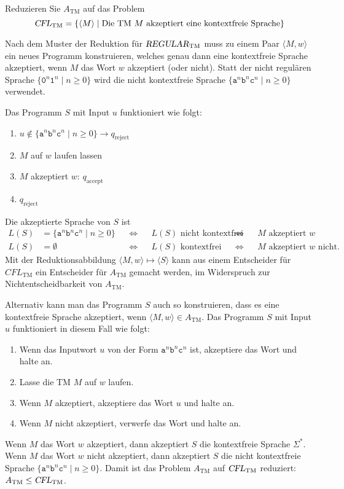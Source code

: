 Reduzieren Sie $A_{\text{TM}}$ auf das Problem
\[
\textsl{CFL}_{\text{TM}}
=
\{
\langle M\rangle
\mid
\text{Die TM $M$ akzeptiert eine kontextfreie Sprache}
\}
\]


\begin{loesung}
Nach dem Muster der Reduktion für $\textsl{REGULAR}_{\text{TM}}$
muss zu einem Paar $\langle M,w\rangle$ ein neues Programm konstruieren,
welches genau dann eine kontextfreie Sprache akzeptiert, wenn 
$M$ das Wort $w$ akzeptiert (oder nicht).
Statt der nicht regulären Sprache $\{\texttt{0}^n\texttt{1}^n\mid n\ge 0\}$
wird die nicht kontextfreie Sprache
$\{\texttt{a}^n\texttt{b}^n\texttt{c}^n\mid n\ge 0\}$ verwendet.

Das Programm $S$ mit Input $u$ funktioniert wie folgt:
\begin{enumerate}
\item
$u\not\in \{\texttt{a}^n\texttt{b}^n\texttt{c}^n\mid n\ge 0\}
\rightarrow
q_{\text{reject}}$
\item
$M$ auf $w$ laufen lassen
\item
$M$ akzeptiert $w$: $q_{\text{accept}}$
\item
$q_{\text{reject}}$
\end{enumerate}
Die akzeptierte Sprache von $S$ ist 
\begin{align*}
L(S) &= \{\texttt{a}^n\texttt{b}^n\texttt{c}^n\mid n\ge 0\}
&&\Leftrightarrow&
&\text{$L(S)$ nicht kontextfrei}
&&\Leftrightarrow&
&\text{$M$ akzeptiert $w$}
\\
L(S) &= \emptyset
&&\Leftrightarrow&
&\text{$L(S)$ kontextfrei}
&&\Leftrightarrow&
&\text{$M$ akzeptiert $w$ nicht.}
\end{align*}
Mit der Reduktionsabbildung $\langle M,w\rangle\mapsto \langle S\rangle$
kann aus einem Entscheider für $\textit{CFL}_{\text{TM}}$ ein
Entscheider für $A_{\text{TM}}$ gemacht werden, im Widerspruch zur 
Nichtentscheidbarkeit von $A_{\text{TM}}$.

Alternativ kann man das Programm $S$ auch so konstruieren, dass es
eine kontextfreie Sprache akzeptiert, wenn
$\langle M,w\rangle\in A_{\text{TM}}$.
Das Programm $S$ mit Input $u$ funktioniert in diesem Fall wie folgt:
\begin{enumerate}
\item
Wenn das Inputwort $u$ von der Form
$\texttt{a}^n\texttt{b}^n\texttt{c}^n$
ist, akzeptiere das Wort und halte an.
\item 
Lasse die TM $M$ auf $w$ laufen.
\item
Wenn $M$ akzeptiert, akzeptiere das Wort $u$ und halte an.
\item
Wenn $M$ nicht akzeptiert, verwerfe das Wort und halte an.
\end{enumerate}
Wenn $M$ das Wort $w$ akzeptiert, dann akzeptiert $S$ die
kontextfreie Sprache $\Sigma^*$.
Wenn $M$ das Wort $w$ nicht akzeptiert, dann akzeptiert $S$ die
nicht kontextfreie Sprache
$\{\texttt{a}^n\texttt{b}^n\texttt{c}^n \mid n\ge 0\}$.
Damit ist das Problem $A_{\text{TM}}$ auf $\textsl{CFL}_{\text{TM}}$
reduziert: $A_{\text{TM}}\le \textsl{CFL}_{\text{TM}}$.
\end{loesung}
